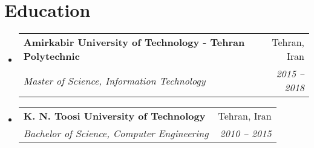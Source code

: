 \documentclass[letterpaper,11pt]{article}
\makeatletter
\newcommand{\resumeSubheading}[5]{
  \vspace{-1pt}\item
    \begin{tabular*}{0.97\textwidth}[t]{l@{\extracolsep{\fill}}r}
      \textbf{#1} \textit{\small{#5}}  & #2 \\
      \textit{\small #3} & \textit{\small #4} \\
    \end{tabular*}\vspace{-5pt}
}
\newcommand{\resumeSubHeadingListStart}{\begin{itemize}[leftmargin=*]}
\newcommand{\resumeSubHeadingListEnd}{\end{itemize}}
\makeatother
\begin{document}
\section{Education}
  \resumeSubHeadingListStart
    \resumeSubheading
      {Amirkabir University of Technology - Tehran Polytechnic}{Tehran, Iran}
      {Master of Science, Information Technology}{2015 -- 2018}{}
    \resumeSubheading
      {K. N. Toosi University of Technology}{Tehran, Iran}
      {Bachelor of Science, Computer Engineering}{2010 -- 2015}{}
  \resumeSubHeadingListEnd
\end{document}
